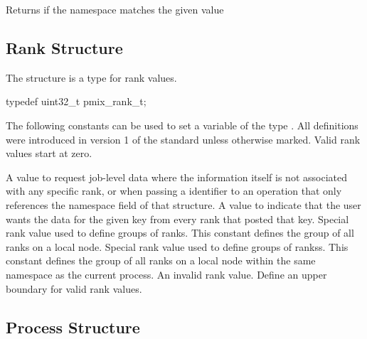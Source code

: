 \begin{arglist}
\end{arglist}

Returns  if the namespace matches the given value


\subsection{Rank Structure}

The  structure is a  type for rank values.

\cspecificstart
\begin{codepar}
typedef uint32_t pmix_rank_t;
\end{codepar}
\cspecificend

The following constants can be used to set a variable of the type . All definitions were introduced in version 1 of the standard unless otherwise marked. Valid rank values start at zero.

\begin{constantdesc}
%
A value to request job-level data where the information itself is not associated with any specific rank, or when passing a  identifier to an operation that only references the namespace field of that structure.
%
A value to indicate that the user wants the data for the given key from every rank that posted that key.
%
Special rank value used to define groups of ranks.
This constant defines the group of all ranks on a local node.
%
Special rank value used to define groups of rankss.
This constant defines the group of all ranks on a local node within the same namespace as the current process.
%
An invalid rank value.
%
Define an upper boundary for valid rank values.
%
\end{constantdesc}


\subsection{Process Structure}

